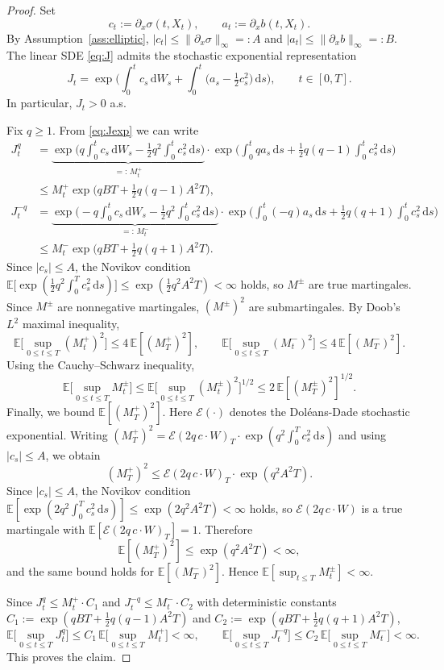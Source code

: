 \documentclass[11pt]{article}
\newcommand{\E}{\mathbb{E}}
\newcommand{\1}{\mathbf{1}}
\newcommand{\dd}{\mathrm{d}}
\theoremstyle{plain}
\theoremstyle{definition}
\theoremstyle{remark}
\begin{document}
\begin{proof}
Set
\[
c_t:=\partial_x\sigma(t,X_t),\qquad a_t:=\partial_x b(t,X_t).
\]
By Assumption~\ref{ass:elliptic}, $|c_t|\le \|\partial_x\sigma\|_\infty=:A$ and $|a_t|\le \|\partial_x b\|_\infty=:B$.
The linear SDE \eqref{eq:J} admits the stochastic exponential representation
\begin{equation}\label{eq:Jexp}
J_t=\exp\Big(\int_0^t c_s\,\dd W_s+\int_0^t\big(a_s-\tfrac12 c_s^2\big)\,\dd s\Big),\qquad t\in[0,T].
\end{equation}
In particular, $J_t>0$ a.s.

Fix $q\ge 1$. From \eqref{eq:Jexp} we can write
\begin{align*}
J_t^{q}
&=\underbrace{\exp\Big(q\int_0^t c_s\,\dd W_s-\tfrac12 q^2\int_0^t c_s^2\,\dd s\Big)}_{=:\,M_t^{+}}
\cdot\exp\Big(\int_0^t q a_s\,\dd s+\tfrac12 q(q-1)\int_0^t c_s^2\,\dd s\Big)\\
&\le M_t^{+}\exp\Big(qBT+\tfrac12 q(q-1)A^2T\Big),\\[4pt]
J_t^{-q}
&=\underbrace{\exp\Big(-q\int_0^t c_s\,\dd W_s-\tfrac12 q^2\int_0^t c_s^2\,\dd s\Big)}_{=:\,M_t^{-}}
\cdot\exp\Big(\int_0^t (-q) a_s\,\dd s+\tfrac12 q(q+1)\int_0^t c_s^2\,\dd s\Big)\\
&\le M_t^{-}\exp\Big(qBT+\tfrac12 q(q+1)A^2T\Big).
\end{align*}
Since $|c_s|\le A$, the Novikov condition
$\E\big[\exp(\frac12 q^2\int_0^T c_s^2\,\dd s)\big]\le \exp(\frac12 q^2 A^2 T)<\infty$
holds, so $M^{\pm}$ are true martingales.
Since $M^{\pm}$ are nonnegative martingales, $(M^{\pm})^2$ are submartingales.
By Doob's $L^2$ maximal inequality,
\[
\E\Big[\sup_{0\le t\le T}(M_t^{+})^2\Big]\le 4\,\E[(M_T^{+})^2],\qquad
\E\Big[\sup_{0\le t\le T}(M_t^{-})^2\Big]\le 4\,\E[(M_T^{-})^2].
\]
Using the Cauchy--Schwarz inequality,
\[
\E\Big[\sup_{0\le t\le T}M_t^{\pm}\Big]
\le \E\Big[\sup_{0\le t\le T}(M_t^{\pm})^2\Big]^{1/2}
\le 2\,\E[(M_T^{\pm})^2]^{1/2}.
\]
Finally, we bound $\E[(M_T^{+})^2]$.
Here $\mathcal{E}(\cdot)$ denotes the Dol\'eans-Dade stochastic exponential.
Writing $(M_T^{+})^2=\mathcal{E}(2q\,c\cdot W)_T\cdot\exp(q^2\int_0^T c_s^2\,\dd s)$
and using $|c_s|\le A$, we obtain
\[
(M_T^{+})^2\le \mathcal{E}(2q\,c\cdot W)_T\cdot\exp(q^2 A^2 T).
\]
Since $|c_s|\le A$, the Novikov condition
$\E[\exp(2q^2\int_0^T c_s^2\,\dd s)]\le \exp(2q^2 A^2 T)<\infty$
holds, so $\mathcal{E}(2q\,c\cdot W)$ is a true martingale with $\E[\mathcal{E}(2q\,c\cdot W)_T]=1$.
Therefore
\[
\E[(M_T^{+})^2]\le \exp(q^2 A^2 T)<\infty,
\]
and the same bound holds for $\E[(M_T^{-})^2]$.
Hence $\E[\sup_{t\le T}M_t^{\pm}]<\infty$.

Since $J_t^q\le M_t^+\cdot C_1$ and $J_t^{-q}\le M_t^-\cdot C_2$ with deterministic constants
$C_1:=\exp(qBT+\frac12 q(q-1)A^2T)$ and $C_2:=\exp(qBT+\frac12 q(q+1)A^2T)$,
\[
\E\Big[\sup_{0\le t\le T}J_t^{q}\Big]
\le C_1\,\E\Big[\sup_{0\le t\le T}M_t^{+}\Big]<\infty,
\qquad
\E\Big[\sup_{0\le t\le T}J_t^{-q}\Big]
\le C_2\,\E\Big[\sup_{0\le t\le T}M_t^{-}\Big]<\infty.
\]
This proves the claim.
\end{proof}
\end{document}
